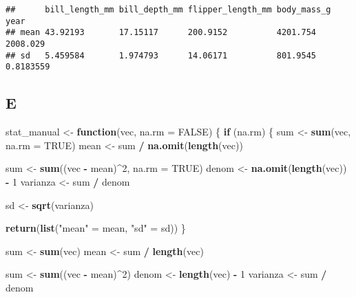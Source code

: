 \documentclass[
]{article}
\newenvironment{Shaded}{\begin{snugshade}}{\end{snugshade}}
\newcommand{\AttributeTok}[1]{\textcolor[rgb]{0.13,0.29,0.53}{#1}}
\newcommand{\ConstantTok}[1]{\textcolor[rgb]{0.56,0.35,0.01}{#1}}
\newcommand{\ControlFlowTok}[1]{\textcolor[rgb]{0.13,0.29,0.53}{\textbf{#1}}}
\newcommand{\DecValTok}[1]{\textcolor[rgb]{0.00,0.00,0.81}{#1}}
\newcommand{\FunctionTok}[1]{\textcolor[rgb]{0.13,0.29,0.53}{\textbf{#1}}}
\newcommand{\NormalTok}[1]{#1}
\newcommand{\OtherTok}[1]{\textcolor[rgb]{0.56,0.35,0.01}{#1}}
\newcommand{\SpecialCharTok}[1]{\textcolor[rgb]{0.81,0.36,0.00}{\textbf{#1}}}
\newcommand{\StringTok}[1]{\textcolor[rgb]{0.31,0.60,0.02}{#1}}
\begin{document}
\begin{verbatim}
##      bill_length_mm bill_depth_mm flipper_length_mm body_mass_g year     
## mean 43.92193       17.15117      200.9152          4201.754    2008.029 
## sd   5.459584       1.974793      14.06171          801.9545    0.8183559
\end{verbatim}

\hypertarget{e}{%
\subsection{E}\label{e}}

\begin{Shaded}
\begin{Highlighting}[]
\NormalTok{stat\_manual }\OtherTok{\textless{}{-}} \ControlFlowTok{function}\NormalTok{(vec, }\AttributeTok{na.rm =} \ConstantTok{FALSE}\NormalTok{) \{}
  \ControlFlowTok{if}\NormalTok{ (na.rm) \{}
\NormalTok{    sum }\OtherTok{\textless{}{-}} \FunctionTok{sum}\NormalTok{(vec, }\AttributeTok{na.rm =} \ConstantTok{TRUE}\NormalTok{)}
\NormalTok{    mean }\OtherTok{\textless{}{-}}\NormalTok{ sum }\SpecialCharTok{/} \FunctionTok{na.omit}\NormalTok{(}\FunctionTok{length}\NormalTok{(vec))}

\NormalTok{    sum }\OtherTok{\textless{}{-}} \FunctionTok{sum}\NormalTok{((vec }\SpecialCharTok{{-}}\NormalTok{ mean)}\SpecialCharTok{\^{}}\DecValTok{2}\NormalTok{, }\AttributeTok{na.rm =} \ConstantTok{TRUE}\NormalTok{)}
\NormalTok{    denom }\OtherTok{\textless{}{-}} \FunctionTok{na.omit}\NormalTok{(}\FunctionTok{length}\NormalTok{(vec)) }\SpecialCharTok{{-}} \DecValTok{1}
\NormalTok{    varianza }\OtherTok{\textless{}{-}}\NormalTok{ sum }\SpecialCharTok{/}\NormalTok{ denom}

\NormalTok{    sd }\OtherTok{\textless{}{-}} \FunctionTok{sqrt}\NormalTok{(varianza)}

    \FunctionTok{return}\NormalTok{(}\FunctionTok{list}\NormalTok{(}\StringTok{"mean"} \OtherTok{=}\NormalTok{ mean, }\StringTok{"sd"} \OtherTok{=}\NormalTok{ sd))}
\NormalTok{  \}}

\NormalTok{  sum }\OtherTok{\textless{}{-}} \FunctionTok{sum}\NormalTok{(vec)}
\NormalTok{  mean }\OtherTok{\textless{}{-}}\NormalTok{ sum }\SpecialCharTok{/} \FunctionTok{length}\NormalTok{(vec)}

\NormalTok{  sum }\OtherTok{\textless{}{-}} \FunctionTok{sum}\NormalTok{((vec }\SpecialCharTok{{-}}\NormalTok{ mean)}\SpecialCharTok{\^{}}\DecValTok{2}\NormalTok{)}
\NormalTok{  denom }\OtherTok{\textless{}{-}} \FunctionTok{length}\NormalTok{(vec) }\SpecialCharTok{{-}} \DecValTok{1}
\NormalTok{  varianza }\OtherTok{\textless{}{-}}\NormalTok{ sum }\SpecialCharTok{/}\NormalTok{ denom}


\end{Highlighting}
\end{Shaded}
\end{document}
